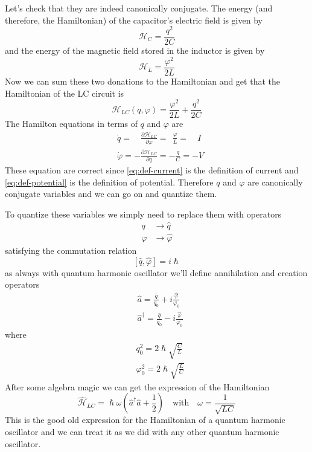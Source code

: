 Let's check that they are indeed canonically conjugate. The energy (and therefore, the Hamiltonian) of the capacitor's electric field is given by
\[
    \mathcal{H}_C = \frac{q^2}{2C}
\]
and the energy of the magnetic field stored in the inductor is given by
\[
    \mathcal{H}_L = \frac{\varphi^2}{2L}
\]
Now we can sum these two donations to the Hamiltonian and get that the Hamiltonian of the LC circuit is
\[
    \mathcal{H}_{LC}(q, \varphi) = \frac{\varphi^2}{2L} + \frac{q^2}{2C}
\]
The Hamilton equations in terms of $q$ and $\varphi$ are
\begin{align}
    &\dot{q} = \quad \frac{\partial \mathcal{H}_{LC}}{\partial \varphi} = \ \ \frac{\varphi}{L} =\quad I \label{eq:def-current}\\
    &\dot{\varphi} = -\frac{\partial \mathcal{H}_{LC}}{\partial q} = -\frac{q}{C} = -V \label{eq:def-potential}
\end{align}
These equation are correct since \ref{eq:def-current} is the definition of current and \ref{eq:def-potential} is the definition of potential. Therefore $q$ and $\varphi$ are canonically conjugate variables and we can go on and quantize them.

To quantize these variables we simply need to replace them with operators
\begin{align*}
    q &\rightarrow \hat{q} \\
    \varphi &\rightarrow \hat{\varphi}
\end{align*}
satisfying the commutation relation
\[
    [\hat{q}, \hat{\varphi}] = i\hslash
\]
as always with quantum harmonic oscillator we'll define annihilation and creation operators
\begin{align*}
    &\hat{a} = \frac{\hat{q}}{q_0} + i\frac{\hat{\varphi}}{\varphi_0} \\
    &\hat{a}^\dag = \frac{\hat{q}}{q_0} - i\frac{\hat{\varphi}}{\varphi_0}
\end{align*}
where
\begin{align*}
    &q_0^2 = 2\hslash\sqrt{\frac{C}{L}} \\
    &\varphi_0^2 = 2\hslash\sqrt{\frac{L}{C}}
\end{align*}
After some algebra magic we can get the expression of the Hamiltonian
\[
    \hat{\mathcal{H}}_{LC} = \hslash \omega (\hat{a}^\dag \hat{a} + \frac{1}{2}) \quad \text{with} \quad \omega = \frac{1}{\sqrt{LC}}
\]
This is the good old expression for the Hamiltonian of a quantum harmonic oscillator and we can treat it as we did with any other quantum harmonic oscillator.

